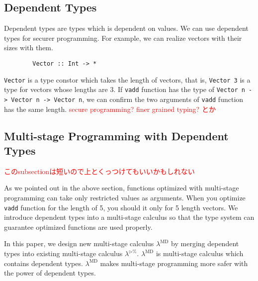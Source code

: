 \documentclass[runningheads]{llncs}
\newcommand{\red}[1]{\textcolor{red}{#1 }}
\newcommand{\LTP}{$\lambda^{\triangleright\%}$\xspace}
\newcommand{\LMD}{$\lambda^{\textrm{MD}}$\xspace}
\begin{document}
\subsection{Dependent Types}


Dependent types are types which is dependent on values.
We can use dependent types for securer programming.
For example, we can realize vectors with their sizes with them.
\begin{verbatim}
        Vector :: Int -> *
\end{verbatim}
\verb|Vector| is a type constor which takes the length of vectors, that is, 
\verb|Vector 3| is a type for vectors whose lengths are 3.
If \verb|vadd| function has the type of \verb|Vector n -> Vector n -> Vector n|,
we can confirm the two arguments of \verb|vadd| function has the same length.
\red{secure programming? finer grained typing? とか}

\subsection{Multi-stage Programming with Dependent Types}
\red{このsubsectionは短いので上とくっつけてもいいかもしれない}


As we pointed out in the above section,
functions optimized with multi-stage programming can take only restricted values as arguments.
When you optimize \verb|vadd| function for the length of 5, you should it only for 5 length vectors.
We introduce dependent types into a multi-stage calculus
so that the type system can guarantee optimized functions are used properly.

In this paper, we design new multi-stage calculus \LMD by 
merging dependent types into existing multi-stage calculus \LTP\cite{Hanada2014}.
\LMD is multi-stage calculus which contains dependent types.
\LMD makes multi-stage programming more safer with the power of dependent types.
\end{document}
